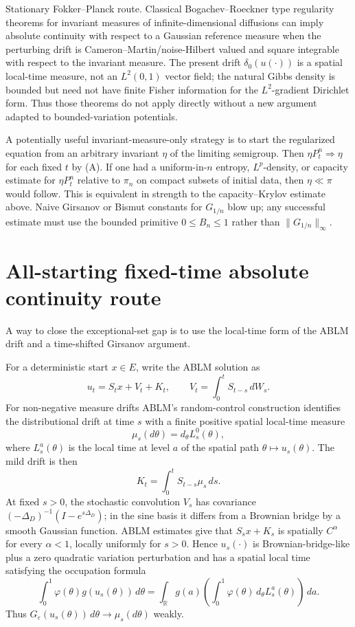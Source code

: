 \documentclass[12pt]{article}
\begin{document}
Stationary Fokker--Planck route.  Classical Bogachev--Roeckner type
regularity theorems for invariant measures of infinite-dimensional
diffusions can imply absolute continuity with respect to a Gaussian
reference measure when the perturbing drift is Cameron--Martin/noise-Hilbert
valued and square integrable with respect to the invariant measure.  The
present drift $\delta_0(u(\cdot))$ is a spatial local-time measure, not an
$L^2(0,1)$ vector field; the natural Gibbs density is bounded but need
not have finite Fisher information for the $L^2$-gradient Dirichlet form.
Thus those theorems do not apply directly without a new argument adapted
to bounded-variation potentials.

A potentially useful invariant-measure-only strategy is to start the
regularized equation from an arbitrary invariant $\eta$ of the limiting
semigroup.  Then $\eta P_t^n\Rightarrow\eta$ for each fixed $t$ by (A).
If one had a uniform-in-$n$ entropy, $L^p$-density, or capacity estimate
for $\eta P_t^n$ relative to $\pi_n$ on compact subsets of initial data,
then $\eta\ll\pi$ would follow.  This is equivalent in strength to the
capacity--Krylov estimate above.  Naive Girsanov or Bismut constants for
$G_{1/n}$ blow up; any successful estimate must use the bounded primitive
$0\le B_n\le1$ rather than $\|G_{1/n}\|_\infty$.



\section*{All-starting fixed-time absolute continuity route}

A way to close the exceptional-set gap is to use the local-time form of
the ABLM drift and a time-shifted Girsanov argument.

For a deterministic start $x\in E$, write the ABLM solution as
\[
  u_t=S_tx+V_t+K_t,\qquad V_t=\int_0^tS_{t-s}\,dW_s .
\]
For non-negative measure drifts ABLM's random-control construction
identifies the distributional drift at time $s$ with a finite positive
spatial local-time measure
\[
  \mu_s(d\theta)=d_\theta L_s^0(\theta),
\]
where $L_s^a(\theta)$ is the local time at level $a$ of the spatial path
$\theta\mapsto u_s(\theta)$.  The mild drift is then
\[
  K_t=\int_0^tS_{t-s}\mu_s\,ds .
\]
At fixed $s>0$, the stochastic convolution $V_s$ has covariance
$(-\Delta_D)^{-1}(I-e^{s\Delta_D})$; in the sine basis it differs from a
Brownian bridge by a smooth Gaussian function.  ABLM estimates give that
$S_sx+K_s$ is spatially $C^\alpha$ for every $\alpha<1$, locally uniformly
for $s>0$.  Hence $u_s(\cdot)$ is Brownian-bridge-like plus a zero
quadratic variation perturbation and has a spatial local time satisfying
the occupation formula
\[
  \int_0^1 \varphi(\theta)g(u_s(\theta))\,d\theta
  =\int_{\mathbb R}g(a)\left(\int_0^1\varphi(\theta)\,d_\theta
     L_s^a(\theta)\right)\,da .
\]
Thus $G_\varepsilon(u_s(\theta))\,d\theta\to\mu_s(d\theta)$ weakly.
\end{document}
